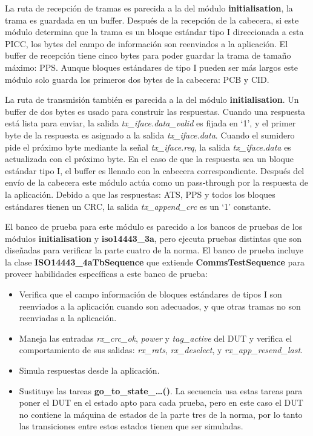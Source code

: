\documentclass[a4paper, twoside, 11pt]{report}
\begin{document}
La ruta de recepción de tramas es parecida a la del módulo \textbf{initialisation}, la trama es guardada en un buffer. Después de la recepción de la cabecera, si este módulo determina que la trama es un bloque estándar tipo I direccionada a esta PICC, los bytes del campo de información son reenviados a la aplicación. El buffer de recepción tiene cinco bytes para poder guardar la trama de tamaño máximo: PPS. Aunque bloques estándares de tipo I pueden ser más largos este módulo solo guarda los primeros dos bytes de la cabecera: PCB y CID.

La ruta de transmisión también es parecida a la del módulo \textbf{initialisation}. Un buffer de dos bytes es usado para construir las respuestas. Cuando una respuesta está lista para enviar, la salida \textit{tx\_iface.data\_valid} es fijada en ‘1’, y el primer byte de la respuesta es asignado a la salida \textit{tx\_iface.data}. Cuando el sumidero pide el próximo byte mediante la señal \textit{tx\_iface.req}, la salida \textit{tx\_iface.data} es actualizada con el próximo byte. En el caso de que la respuesta sea un bloque estándar tipo I, el buffer es llenado con la cabecera correspondiente. Después del envío de la cabecera este módulo actúa como un pass-through por la respuesta de la aplicación. Debido a que las respuestas: ATS, PPS y todos los bloques estándares tienen un CRC, la salida \textit{tx\_append\_crc} es un ‘1’ constante.

El banco de prueba para este módulo es parecido a los bancos de pruebas de los módulos \textbf{initialisation} y \textbf{iso14443\_3a}, pero ejecuta pruebas distintas que son diseñadas para verificar la parte cuatro de la norma. El banco de prueba incluye la clase \textbf{ISO14443\_4aTbSequence} que extiende \textbf{CommsTestSequence} para proveer habilidades específicas a este banco de prueba:

\begin{itemize}
  \item Verifica que el campo información de bloques estándares de tipos I son reenviados a la aplicación cuando son adecuados, y que otras tramas no son reenviadas a la aplicación.
  \item Maneja las entradas \textit{rx\_crc\_ok}, \textit{power} y \textit{tag\_active} del DUT y verifica el comportamiento de sus salidas: \textit{rx\_rats}, \textit{rx\_deselect}, y \textit{rx\_app\_resend\_last}. 
  \item Simula respuestas desde la aplicación.
  \item Sustituye las tareas \textbf{go\_to\_state\_…()}. La secuencia usa estas tareas para poner el DUT en el estado apto para cada prueba, pero en este caso el DUT no contiene la máquina de estados de la parte tres de la norma, por lo tanto las transiciones entre estos estados tienen que ser simuladas.
\end{itemize}
\end{document}
